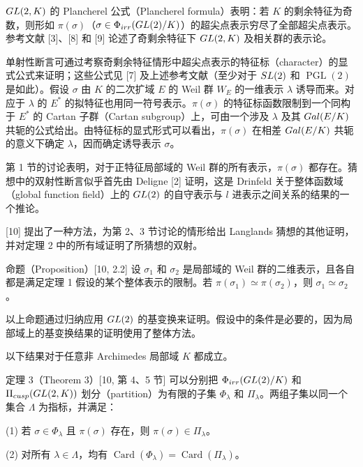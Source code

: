 $GL(2,K)$ 的 Plancherel 公式（Plancherel formula）表明：若 $K$ 的剩余特征为奇数，则形如 $\pi(\sigma)$（$\sigma\in\Phi_{irr}(GL(2)/K)$）的超尖点表示穷尽了全部超尖点表示。参考文献 [3]、[8] 和 [9] 论述了奇剩余特征下 $GL(2,K)$ 及相关群的表示论。

单射性断言可通过考察奇剩余特征情形中超尖点表示的特征标（character）的显式公式来证明；这些公式见 [7] 及上述参考文献（至少对于 $SL(2)$ 和 $\operatorname{PGL}(2)$ 是如此）。假设 $\sigma$ 由 $K$ 的二次扩域 $E$ 的 Weil 群 $W_E$ 的一维表示 $\lambda$ 诱导而来。对应于 $\lambda$ 的 $E^*$ 的拟特征也用同一符号表示。$\pi(\sigma)$ 的特征标函数限制到一个同构于 $E^*$ 的 Cartan 子群（Cartan subgroup）上，可由一个涉及 $\lambda$ 及其 $Gal(E/K)$ 共轭的公式给出。由特征标的显式形式可以看出，$\pi(\sigma)$ 在相差 $Gal(E/K)$ 共轭的意义下确定 $\lambda$，因而确定诱导表示 $\sigma$。

第 1 节的讨论表明，对于正特征局部域的 Weil 群的所有表示，$\pi(\sigma)$ 都存在。猜想中的双射性断言似乎首先由 Deligne [2] 证明，这是 Drinfeld 关于整体函数域（global function field）上的 $GL(2)$ 的自守表示与 $l$ 进表示之间关系的结果的一个推论。

[10] 提出了一种方法，为第 2、3 节讨论的情形给出 Langlands 猜想的其他证明，并对定理 2 中的所有域证明了所猜想的双射。

\begin{originaltheorem}{命题（Proposition）[10, 2.2]}
设 $\sigma_1$ 和 $\sigma_2$ 是局部域的 Weil 群的二维表示，且各自都是满足定理 1 假设的某个整体表示的限制。若 $\pi(\sigma_1)\simeq\pi(\sigma_2)$，则 $\sigma_1\simeq\sigma_2$。
\end{originaltheorem}

以上命题通过归纳应用 $GL(2)$ 的基变换来证明。假设中的条件是必要的，因为局部域上的基变换结果的证明使用了整体方法。

以下结果对于任意非 Archimedes 局部域 $K$ 都成立。

\begin{originaltheorem}{定理 3（Theorem 3）[10, 第 4、5 节]}
可以分别把 $\Phi_{irr}(GL(2)/K)$ 和 $\Pi_{cusp}(GL(2,K))$ 划分（partition）为有限的子集 $\Phi_\lambda$ 和 $\Pi_\lambda$。两组子集以同一个集合 $\Lambda$ 为指标，并满足：

(1) 若 $\sigma\in\Phi_\lambda$ 且 $\pi(\sigma)$ 存在，则 $\pi(\sigma)\in\Pi_\lambda$。

(2) 对所有 $\lambda\in\Lambda$，均有 $\operatorname{Card}(\Phi_\lambda)=\operatorname{Card}(\Pi_\lambda)$。
\end{originaltheorem}

